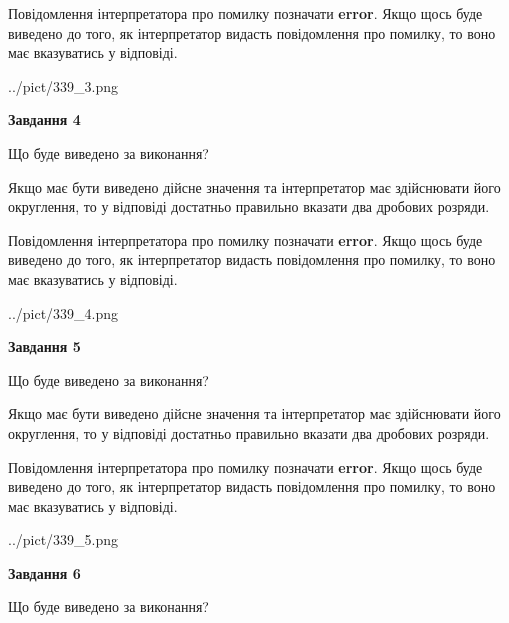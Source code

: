 \documentclass[12pt, ukrainian]{article}
\begin{document}
{\begin {Large}
Повідомлення інтерпретатора про помилку позначати \textbf{error}.
Якщо щось буде виведено до того, як інтерпретатор видасть повідомлення про помилку, 
то воно має вказуватись у відповіді. \par

\begin{center}
	{../pict/339_3.png}
\end{center}
\newpage

{\begin {center}\textbf{Завдання 4}\end {center}}\par
Що буде виведено за виконання? \par

Якщо має бути виведено дійсне значення та інтерпретатор має здійснювати його округлення, 
то у відповіді достатньо правильно вказати два дробових розряди.

Повідомлення інтерпретатора про помилку позначати \textbf{error}.
Якщо щось буде виведено до того, як інтерпретатор видасть повідомлення про помилку, 
то воно має вказуватись у відповіді. \par

\begin{center}
	{../pict/339_4.png}
\end{center}
\newpage

{\begin {center}\textbf{Завдання 5}\end {center}}\par
Що буде виведено за виконання? \par

Якщо має бути виведено дійсне значення та інтерпретатор має здійснювати його округлення, 
то у відповіді достатньо правильно вказати два дробових розряди.

Повідомлення інтерпретатора про помилку позначати \textbf{error}.
Якщо щось буде виведено до того, як інтерпретатор видасть повідомлення про помилку, 
то воно має вказуватись у відповіді. \par

\begin{center}
	{../pict/339_5.png}
\end{center}
\newpage

{\begin {center}\textbf{Завдання 6}\end {center}}\par
Що буде виведено за виконання? \par


\end{Large}}
\end{document}
